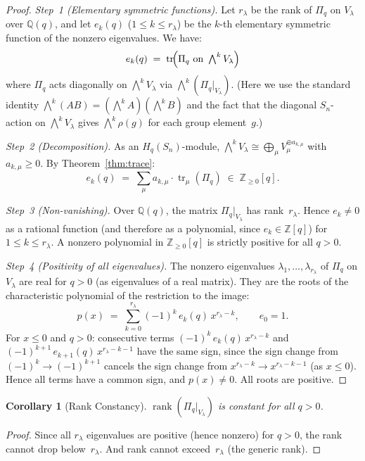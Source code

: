 \documentclass[11pt]{article}
\newtheorem{corollary}[theorem]{Corollary}
\theoremstyle{remark}
\begin{document}
\begin{proof}
\emph{Step~1 (Elementary symmetric functions).}
Let $r_\lambda$ be the rank of $\Pi_q$ on $V_\lambda$ over $\mathbb{Q}(q)$,
and let $e_k(q)$ ($1 \leq k \leq r_\lambda$) be the $k$-th elementary
symmetric function of the nonzero eigenvalues. We have:
\[
  e_k(q) \;=\; \operatorname{tr}\!\Bigl(
    \Pi_q \text{ on } \textstyle\bigwedge^k V_\lambda
  \Bigr)
\]
where $\Pi_q$ acts diagonally on $\bigwedge^k V_\lambda$ via
$\bigwedge^k(\Pi_q|_{V_\lambda})$.
(Here we use the standard identity
$\bigwedge^k(AB) = (\bigwedge^k A)(\bigwedge^k B)$
and the fact that the diagonal $S_n$-action on $\bigwedge^k V_\lambda$
gives $\bigwedge^k \rho(g)$ for each group element~$g$.)

\emph{Step~2 (Decomposition).}
As an $H_q(S_n)$-module,
$\bigwedge^k V_\lambda \cong \bigoplus_\mu V_\mu^{\oplus a_{k,\mu}}$
with $a_{k,\mu} \geq 0$.
By Theorem~\ref{thm:trace}:
\[
  e_k(q) \;=\; \sum_\mu a_{k,\mu} \cdot \operatorname{tr}_\mu(\Pi_q)
  \;\in\; \mathbb{Z}_{\geq 0}[q].
\]

\emph{Step~3 (Non-vanishing).}
Over $\mathbb{Q}(q)$, the matrix $\Pi_q|_{V_\lambda}$ has rank~$r_\lambda$.
Hence $e_k \neq 0$ as a rational function (and therefore as a polynomial,
since $e_k \in \mathbb{Z}[q]$) for $1 \leq k \leq r_\lambda$.
A nonzero polynomial in $\mathbb{Z}_{\geq 0}[q]$ is strictly positive
for all $q > 0$.

\emph{Step~4 (Positivity of all eigenvalues).}
The nonzero eigenvalues $\lambda_1, \ldots, \lambda_{r_\lambda}$ of
$\Pi_q$ on $V_\lambda$ are real for $q > 0$ (as eigenvalues of a real matrix).
They are the roots of the characteristic polynomial of the restriction to the
image:
\[
  p(x) \;=\; \sum_{k=0}^{r_\lambda} (-1)^k\, e_k(q)\, x^{r_\lambda - k},
  \qquad e_0 = 1.
\]
For $x \leq 0$ and $q > 0$: consecutive terms
$(-1)^k\, e_k(q)\, x^{r_\lambda - k}$ and
$(-1)^{k+1}\, e_{k+1}(q)\, x^{r_\lambda - k - 1}$
have the same sign, since the sign change from $(-1)^k \to (-1)^{k+1}$
cancels the sign change from $x^{r_\lambda-k} \to x^{r_\lambda-k-1}$
(as $x \leq 0$).
Hence all terms have a common sign, and $p(x) \neq 0$.
All roots are positive.
\end{proof}

\begin{corollary}[Rank Constancy]\label{cor:rank}
$\operatorname{rank}(\Pi_q|_{V_\lambda})$ is constant for all $q > 0$.
\end{corollary}

\begin{proof}
Since all $r_\lambda$ eigenvalues are positive (hence nonzero) for $q > 0$,
the rank cannot drop below~$r_\lambda$.
And rank cannot exceed~$r_\lambda$ (the generic rank).
\end{proof}
\end{document}
